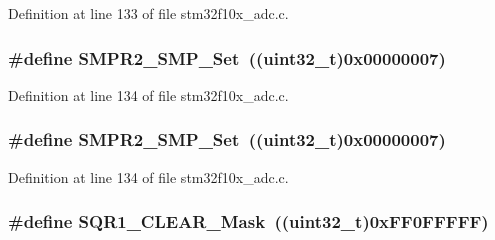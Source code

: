 Definition at line 133 of file stm32f10x\+\_\+adc.\+c.

\subsubsection[{\texorpdfstring{S\+M\+P\+R2\+\_\+\+S\+M\+P\+\_\+\+Set}{SMPR2_SMP_Set}}]{\setlength{\rightskip}{0pt plus 5cm}\#define S\+M\+P\+R2\+\_\+\+S\+M\+P\+\_\+\+Set~(({\bf uint32\+\_\+t})0x00000007)}\hypertarget{group___a_d_c___private___defines_ga6555beb1970c42125678d80530bba4d3}{}\label{group___a_d_c___private___defines_ga6555beb1970c42125678d80530bba4d3}


Definition at line 134 of file stm32f10x\+\_\+adc.\+c.

\subsubsection[{\texorpdfstring{S\+M\+P\+R2\+\_\+\+S\+M\+P\+\_\+\+Set}{SMPR2_SMP_Set}}]{\setlength{\rightskip}{0pt plus 5cm}\#define S\+M\+P\+R2\+\_\+\+S\+M\+P\+\_\+\+Set~(({\bf uint32\+\_\+t})0x00000007)}\hypertarget{group___a_d_c___private___defines_ga6555beb1970c42125678d80530bba4d3}{}\label{group___a_d_c___private___defines_ga6555beb1970c42125678d80530bba4d3}


Definition at line 134 of file stm32f10x\+\_\+adc.\+c.

\subsubsection[{\texorpdfstring{S\+Q\+R1\+\_\+\+C\+L\+E\+A\+R\+\_\+\+Mask}{SQR1_CLEAR_Mask}}]{\setlength{\rightskip}{0pt plus 5cm}\#define S\+Q\+R1\+\_\+\+C\+L\+E\+A\+R\+\_\+\+Mask~(({\bf uint32\+\_\+t})0x\+F\+F0\+F\+F\+F\+F\+F)}\hypertarget{group___a_d_c___private___defines_ga6e3e238f38d7ff17939cbd5417fc51cc}{}\label{group___a_d_c___private___defines_ga6e3e238f38d7ff17939cbd5417fc51cc}


